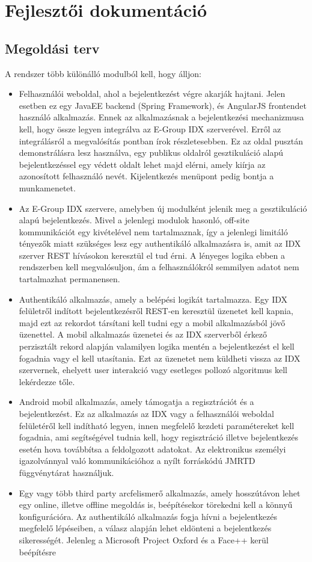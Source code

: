 \section{Fejlesztői dokumentáció}
\subsection{Megoldási terv}
A rendszer több különálló modulból kell, hogy álljon:
\begin{itemize}
\item Felhasználói weboldal, ahol a bejelentkezést végre akarják hajtani. Jelen esetben ez egy JavaEE backend (Spring Framework), és AngularJS frontendet használó alkalmazás. Ennek az alkalmazásnak a bejelentkezési mechanizmusa kell, hogy össze legyen integrálva az E-Group IDX szerverével. Erről az integrálásról a megvalósítás pontban írok részletesebben. Ez az oldal pusztán demonstrálásra lesz használva, egy publikus oldalról gesztikuláció alapú bejelentkezéssel egy védett oldalt lehet majd elérni, amely kiírja az azonosított felhasználó nevét. Kijelentkezés menüpont pedig bontja a munkamenetet.
\item Az E-Group IDX szervere, amelyben új modulként jelenik meg a gesztikuláció alapú bejelentkezés. Mivel a jelenlegi modulok hasonló, off-site kommunikációt egy kivételével nem tartalmaznak, így a jelenlegi limitáló tényezők miatt szükséges lesz egy authentikáló alkalmazásra is, amit az IDX szerver REST hívásokon keresztül el tud érni. A lényeges logika ebben a rendszerben kell megvalósuljon, ám a felhasználókról semmilyen adatot nem tartalmazhat permanensen.
\item Authentikáló alkalmazás, amely a belépési logikát tartalmazza. Egy IDX felületről indított bejelentkezésről REST-en keresztül üzenetet kell kapnia, majd ezt az rekordot társítani kell tudni egy a mobil alkalmazásból jövő üzenettel. A mobil alkalmazás üzenetei és az IDX szerverből érkező perzisztált rekord alapján valamilyen logika mentén a bejelentkezést el kell fogadnia vagy el kell utasítania. Ezt az üzenetet nem küldheti vissza az IDX szervernek, ehelyett user interakció vagy esetleges pollozó algoritmus kell lekérdezze tőle.
\item Android mobil alkalmazás, amely támogatja a regisztrációt és a bejelentkezést. Ez az alkalmazás az IDX vagy a felhasználói weboldal felületéről kell indítható legyen, innen megfelelő kezdeti paramétereket kell fogadnia, ami segítségével tudnia kell, hogy regisztráció illetve bejelentkezés esetén hova továbbítsa a feldolgozott adatokat. Az elektronikus személyi igazolvánnyal való kommunikációhoz a nyílt forráskódú JMRTD függvénytárat használjuk.
\item Egy vagy több third party arcfelismerő alkalmazás, amely hosszútávon lehet egy online, illetve offline megoldás is, beépítésekor törekedni kell a könnyű konfigurációra. Az authentikáló alkalmazás fogja hívni a bejelentkezés megfelelő lépéseiben, a válasz alapján lehet eldönteni a bejelentkezés sikerességét. Jelenleg a Microsoft Project Oxford és a Face++ kerül beépítésre
\end{itemize}

